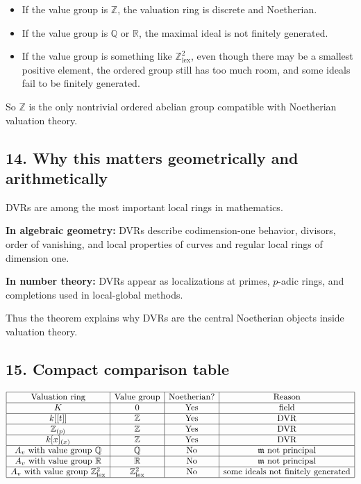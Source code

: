 \documentclass[12pt,a4paper]{article}
\theoremstyle{notespace}
\begin{document}
\begin{itemize}
	\item If the value group is \(\mathbb Z\), the valuation ring is discrete and Noetherian.
	\item If the value group is \(\mathbb Q\) or \(\mathbb R\), the maximal ideal is not finitely generated.
	\item If the value group is something like \(\mathbb Z^2_{\mathrm{lex}}\), even though there may be a smallest positive element, the ordered group still has too much room, and some ideals fail to be finitely generated.
\end{itemize}

So \(\mathbb Z\) is the only nontrivial ordered abelian group compatible with Noetherian valuation theory.

\subsection{14. Why this matters geometrically and arithmetically}

DVRs are among the most important local rings in mathematics.

\textbf{In algebraic geometry:}
DVRs describe codimension-one behavior, divisors, order of vanishing, and local properties of curves and regular local rings of dimension one.

\textbf{In number theory:}
DVRs appear as localizations at primes, \(p\)-adic rings, and completions used in local-global methods.

Thus the theorem explains why DVRs are the central Noetherian objects inside valuation theory.

\subsection{15. Compact comparison table}

\[
\begin{array}{|c|c|c|c|}
	\hline
	\text{Valuation ring} & \text{Value group} & \text{Noetherian?} & \text{Reason} \\
	\hline
	K & 0 & \text{Yes} & \text{field} \\
	\hline
	k[[t]] & \mathbb Z & \text{Yes} & \text{DVR} \\
	\hline
	\mathbb Z_{(p)} & \mathbb Z & \text{Yes} & \text{DVR} \\
	\hline
	k[x]_{(x)} & \mathbb Z & \text{Yes} & \text{DVR} \\
	\hline
	A_v \text{ with value group } \mathbb Q & \mathbb Q & \text{No} & \mathfrak m \text{ not principal} \\
	\hline
	A_v \text{ with value group } \mathbb R & \mathbb R & \text{No} & \mathfrak m \text{ not principal} \\
	\hline
	A_v \text{ with value group } \mathbb Z^2_{\mathrm{lex}} & \mathbb Z^2_{\mathrm{lex}} & \text{No} & \text{some ideals not finitely generated} \\
	\hline
\end{array}
\]
\end{document}
